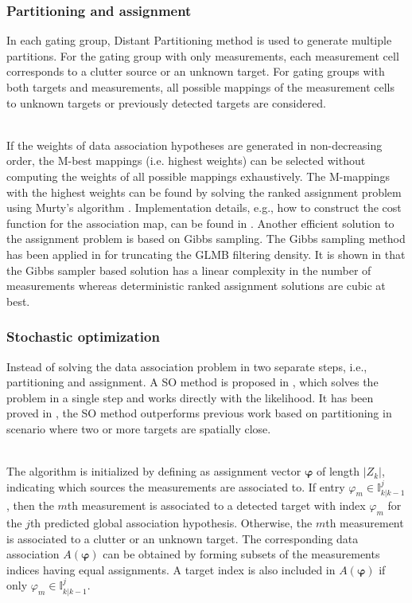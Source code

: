 \subsubsection{Partitioning and assignment}
In each gating group, Distant Partitioning method \cite{phdextended,phdextended2} is used to generate multiple partitions. For the gating group with only measurements, each measurement cell corresponds to a clutter source or an unknown target. For gating groups with both targets and measurements, all possible mappings of the measurement cells to unknown targets or previously detected targets are considered. 

~\\
If the weights of data association hypotheses are generated in non-decreasing order, the M-best mappings (i.e. highest weights) can be selected without computing the weights of all possible mappings exhaustively. The M-mappings with the highest weights can be found by solving the ranked assignment problem using Murty’s algorithm \cite{murty}. Implementation details, e.g., how to construct the cost function for the association map, can be found in \cite{pmbmpoint2}. Another efficient solution to the assignment problem is based on Gibbs sampling. The Gibbs sampling method has been applied in \cite{gibbsglmb} for truncating the GLMB filtering density. It is shown in \cite{gibbsglmb} that the Gibbs sampler based solution has a linear complexity in the number of measurements whereas deterministic ranked assignment solutions are cubic at best. 


\subsubsection{Stochastic optimization}
Instead of solving the data association problem in two separate steps, i.e., partitioning and assignment. A SO method is proposed in \cite{soextended}, which solves the problem in a single step and works directly with the likelihood. It has been proved in \cite{soextended}, the SO method outperforms previous work based on partitioning in scenario where two or more targets are spatially close. 

~\\
The algorithm is initialized by defining as assignment vector $\boldsymbol{\varphi}$ of length $|Z_k|$, indicating which sources the measurements are associated to. If entry $\varphi_m\in\mathbb{I}^j_{k|k-1}$, then the $m$th measurement is associated to a detected target with index $\varphi_m$ for the $j$th predicted global association hypothesis. Otherwise, the $m$th measurement is associated to a clutter or an unknown target. The corresponding data association $A(\boldsymbol{\varphi})$ can be obtained by forming subsets of the measurements indices having equal assignments. A target index is also included in $A(\boldsymbol{\varphi})$ if only $\varphi_m\in\mathbb{I}^j_{k|k-1}$. 

